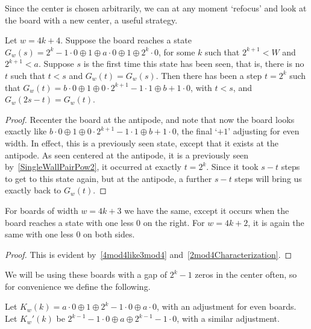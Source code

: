 \documentclass[12pt,letterpaper]{article}
\begin{document}
Since the center is chosen arbitrarily, we can at any moment `refocus' and look at the board with a new center, a useful strategy. 
\begin{prop}\label{SymmetricAntipode}
  Let $w=4k+4$. Suppose the board reaches a state $G_w(s)=2^k-1\cdot 0\oplus 1\oplus a\cdot 0\oplus 1\oplus 2^k\cdot 0$, for some $k$ such that $2^{k+1}<W$ and $2^{k+1}<a$. Suppose $s$ is the first time this state has been seen, that is, there is no $t$ such that $t<s$ and $G_w(t)=G_w(s)$. Then there has been a step $t=2^k$ such that $G_w(t)=b\cdot 0 \oplus 1\oplus 0\cdot 2^{k+1}-1\cdot 1\oplus b+1\cdot 0$, with $t<s$, and $G_w(2s-t)=G_w(t)$. 
\end{prop}
\begin{proof} Recenter the board at the antipode, and note that now the board looks exactly like $b\cdot 0 \oplus 1\oplus 0\cdot 2^{k+1}-1\cdot 1\oplus b+1\cdot 0$, the final `$+1$' adjusting for even width. In effect, this is a previously seen state, except that it exists at the antipode. As seen centered at the antipode, it is a previously seen by~\cref{SingleWallPairPow2}, it occurred at exactly $t=2^k$. Since it took $s-t$ steps to get to this state again, but at the antipode, a further $s-t$ steps will bring us exactly back to $G_w(t)$.
\end{proof}
\begin{cor}\label{SymmetricAntipodeAll}
  For boards of width $w=4k+3$ we have the same, except it occurs when the board reaches a state with one less 0 on the right. For $w=4k+2$, it is again the same with one less 0 on both sides. 
\end{cor}
\begin{proof}
  This is evident by~\cref{4mod4like3mod4} and~\cref{2mod4Characterization}. 
\end{proof}

We will be using these boards with a gap of $2^k-1$ zeros in the center often, so for convenience we define the following.
\begin{dfn}
  Let $K_w(k)=a\cdot 0\oplus 1\oplus 2^k-1\cdot 0\oplus a\cdot 0$, with an adjustment for even boards. Let $K_w'(k)$ be $2^{k-1}-1\cdot 0\oplus a\oplus 2^{k-1}-1\cdot 0$, with a similar adjustment.
\end{dfn}
\end{document}
